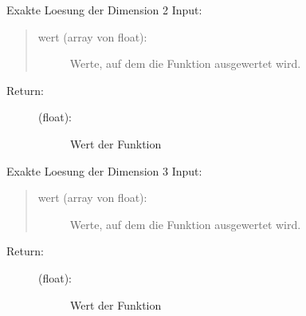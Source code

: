 \documentclass[letterpaper,10pt,ngerman]{sphinxmanual}
\begin{document}

\begin{fulllineitems}
\label{\detokenize{index:aufg_5_2.ulsg2}}
Exakte Loesung der Dimension 2
Input:
\begin{quote}
\begin{description}
\item[{wert (array von float):}] \leavevmode
Werte, auf dem die Funktion ausgewertet wird.

\end{description}
\end{quote}
\begin{description}
\item[{Return:}] \leavevmode\begin{description}
\item[{(float):}] \leavevmode
Wert der Funktion

\end{description}

\end{description}

\end{fulllineitems}


\begin{fulllineitems}
\label{\detokenize{index:aufg_5_2.ulsg3}}
Exakte Loesung der Dimension 3
Input:
\begin{quote}
\begin{description}
\item[{wert (array von float):}] \leavevmode
Werte, auf dem die Funktion ausgewertet wird.

\end{description}
\end{quote}
\begin{description}
\item[{Return:}] \leavevmode\begin{description}
\item[{(float):}] \leavevmode
Wert der Funktion

\end{description}

\end{description}

\end{fulllineitems}
\end{document}

